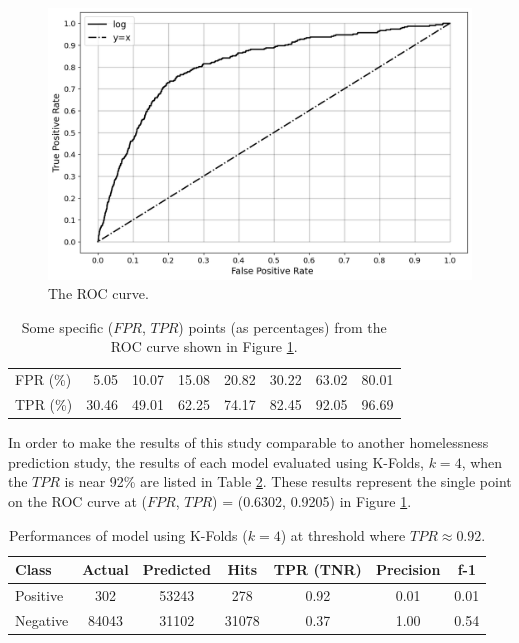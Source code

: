 \documentclass[utf8]{frontiersFPHY} %
\begin{document}
\begin{figure}[h]
    \centering
    \includegraphics[width=\textwidth]{../img/ROC.png}
    \caption[ROC curve]{The ROC curve.}
    \label{fig:ROC}
\end{figure}

\begin{table}[h]
    \centering
    \begin{tabular}{lrrrrrrr}
        \toprule
        FPR (\%) &  5.05 & 10.07 & 15.08 & 20.82 & 30.22 & 63.02 & 80.01 \\
        TPR (\%) & 30.46 & 49.01 & 62.25 & 74.17 & 82.45 & 92.05 & 96.69 \\
        \bottomrule
    \end{tabular}
    \caption{Some specific ($FPR$, $TPR$) points (as percentages) from the ROC curve shown in Figure \ref{fig:ROC}.}
    \label{tbl:ROCpoints}
\end{table}

In order to make the results of this study comparable to another homelessness prediction study, the results of each model evaluated using K-Folds, $k=4$, when the $TPR$ is near 92\% are listed in Table \ref{tbl:perfAtRec092}. These results represent the single point on the ROC curve at ($FPR$, $TPR$) = (0.6302, 0.9205) in Figure \ref{fig:ROC}. 

\begin{table}
    \centering
    \begin{tabular}{lcccccc}
        \toprule
        Class & Actual & Predicted &  Hits &  TPR (TNR) &  Precision &  f-1 \\
        \midrule
        Positive &    302 &     53243 &   278 &       0.92 &       0.01 & 0.01 \\
        Negative &  84043 &     31102 & 31078 &       0.37 &       1.00 & 0.54 \\
        \bottomrule
    \end{tabular}
    \caption[Performance of model when recall is 0.92]{Performances of model using K-Folds ($k=4$) at threshold where $TPR \approx 0.92$.}
    \label{tbl:perfAtRec092}
\end{table}
\end{document}
